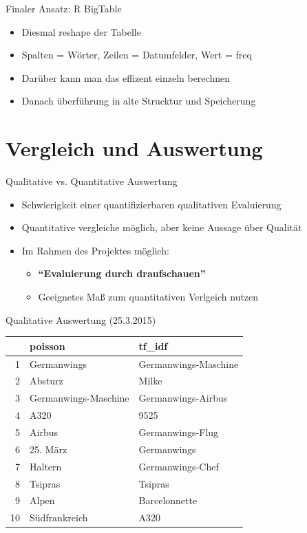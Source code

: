 \documentclass{beamer}
\begin{document}
\begin{frame}{Finaler Ansatz: R BigTable}
	\begin{itemize}
		\item Diesmal reshape der Tabelle
		\item Spalten = Wörter, Zeilen = Datumfelder, Wert = freq
		\item Darüber kann man das effizent einzeln berechnen
		\item Danach überführung in alte Strucktur und Speicherung
	\end{itemize}

\end{frame}

\section{Vergleich und Auswertung}
\begin{frame} \sectionpage \end{frame}
\begin{frame}{Qualitative vs. Quantitative Auswertung}
	\begin{itemize}
		\item{Schwierigkeit einer quantifizierbaren qualitativen Evaluierung}
		\item{Quantitative vergleiche m\"oglich, aber keine Aussage \"uber Qualit\"at}
		\item{Im Rahmen des Projektes m\"oglich:
			\begin{itemize}
				\item{\textbf{``Evaluierung durch draufschauen''}}
				\item{Geeignetes Maß zum quantitativen Verlgeich nutzen}
			\end{itemize}
		}
	\end{itemize}
\end{frame}

\begin{frame}{Qualitative Auswertung (25.3.2015)}
\begin{table}[ht]
\centering
\begin{tabular}{rll}
  \hline
 & poisson & tf\_idf \\ 
  \hline
1 & Germanwings & Germanwings-Maschine \\ 
  2 & Absturz & Milke \\ 
  3 & Germanwings-Maschine & Germanwings-Airbus \\ 
  4 & A320 & 9525 \\ 
  5 & Airbus & Germanwings-Flug \\ 
  6 & 25. März & Germanwings \\ 
  7 & Haltern & Germanwings-Chef \\ 
  8 & Tsipras & Tsipras \\ 
  9 & Alpen & Barcelonnette \\ 
  10 & Südfrankreich & A320 \\ 
   \hline
\end{tabular}
\end{table}
\end{frame}
\end{document}
